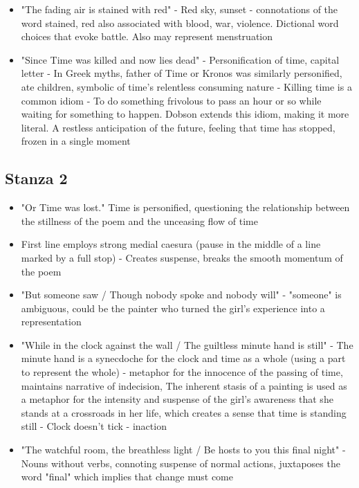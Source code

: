 \begin{itemize}
		\item "The fading air is stained with red" - Red sky, sunset - connotations of the word stained, red also associated with blood, war, violence. Dictional word choices that evoke battle. Also may represent menstruation
		\item "Since Time was killed and now lies dead" - Personification of time, capital letter - In Greek myths, father of Time or Kronos was similarly personified, ate children, symbolic of time's relentless consuming nature - Killing time is a common idiom - To do something frivolous to pass an hour or so while waiting for something to happen. Dobson extends this idiom, making it more literal. A restless anticipation of the future, feeling that time has stopped, frozen in a single moment
	\end{itemize}

\subsection{Stanza 2}
	\begin{itemize}
		\item "Or Time was lost." Time is personified, questioning the relationship between the stillness of the poem and the unceasing flow of time
		\item First line employs strong medial caesura (pause in the middle of a line marked by a full stop) - Creates suspense, breaks the smooth momentum of the poem
		\item "But someone saw / Though nobody spoke and nobody will" - "someone" is ambiguous, could be the painter who turned the girl's experience into a representation
		\item "While in the clock against the wall / The guiltless minute hand is still" - The minute hand is a synecdoche for the clock and time as a whole (using a part to represent the whole) - metaphor for the innocence of the passing of time,  maintains narrative of indecision, The inherent stasis of a painting is used as a metaphor for the intensity and suspense of the girl's awareness that she stands at a crossroads in her life, which creates a sense that time is standing still - Clock doesn't tick - inaction
		\item "The watchful room, the breathless light / Be hosts to you this final night" - Nouns without verbs, connoting suspense of normal actions, juxtaposes the word "final" which implies that change must come
	\end{itemize}

